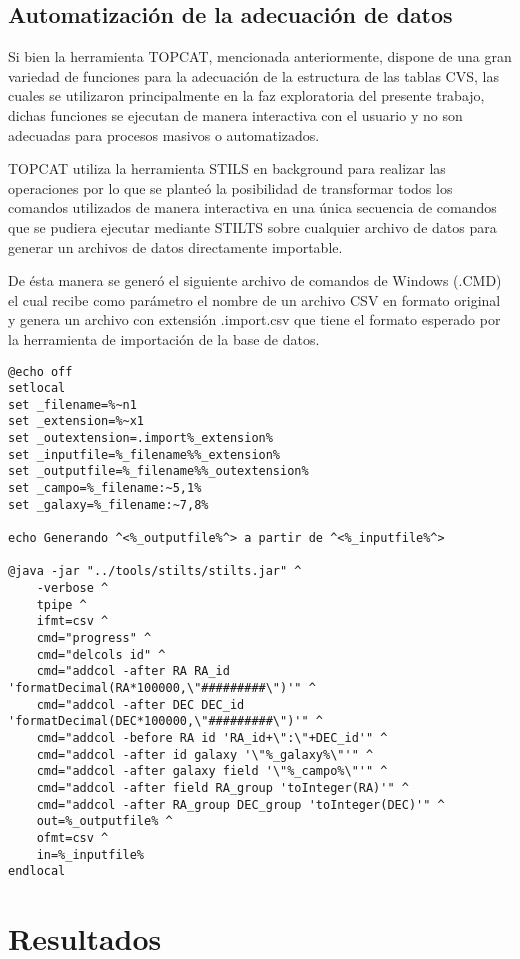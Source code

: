 \documentclass[a4paper,headsepline,footsepline,draft=false]{scrartcl}
\begin{document}
\subsection{Automatización de la adecuación de datos}

Si bien la herramienta TOPCAT, mencionada anteriormente, dispone de una gran variedad de funciones para la adecuación de la estructura de las tablas CVS, las cuales se utilizaron principalmente en la faz exploratoria del presente trabajo, dichas funciones se ejecutan de manera interactiva con el usuario y no son adecuadas para procesos masivos o automatizados.

TOPCAT utiliza la herramienta STILS\cite{stilts} en background para realizar las operaciones por lo que se planteó la posibilidad de transformar todos los comandos utilizados de manera interactiva en una única secuencia de comandos que se pudiera ejecutar mediante STILTS sobre cualquier archivo de datos para generar un archivos de datos directamente importable.

De ésta manera se generó el siguiente archivo de comandos de Windows (.CMD) el cual recibe como parámetro el nombre de un archivo CSV en formato original y genera un archivo con extensión .import.csv que tiene el formato esperado por la herramienta de importación de la base de datos.

\begin{lstlisting}[language=command.com,caption={Archivo batch para la conversión de fuentes de datos}]
@echo off
setlocal
set _filename=%~n1
set _extension=%~x1
set _outextension=.import%_extension%
set _inputfile=%_filename%%_extension%
set _outputfile=%_filename%%_outextension%
set _campo=%_filename:~5,1%
set _galaxy=%_filename:~7,8%

echo Generando ^<%_outputfile%^> a partir de ^<%_inputfile%^>

@java -jar "../tools/stilts/stilts.jar" ^
	-verbose ^
	tpipe ^
	ifmt=csv ^
	cmd="progress" ^
	cmd="delcols id" ^
	cmd="addcol -after RA RA_id 'formatDecimal(RA*100000,\"#########\")'" ^
	cmd="addcol -after DEC DEC_id 'formatDecimal(DEC*100000,\"#########\")'" ^
	cmd="addcol -before RA id 'RA_id+\":\"+DEC_id'" ^
	cmd="addcol -after id galaxy '\"%_galaxy%\"'" ^
	cmd="addcol -after galaxy field '\"%_campo%\"'" ^
	cmd="addcol -after field RA_group 'toInteger(RA)'" ^
	cmd="addcol -after RA_group DEC_group 'toInteger(DEC)'" ^
	out=%_outputfile% ^
	ofmt=csv ^
	in=%_inputfile% 
endlocal  
\end{lstlisting}

\section{Resultados}
\end{document}
